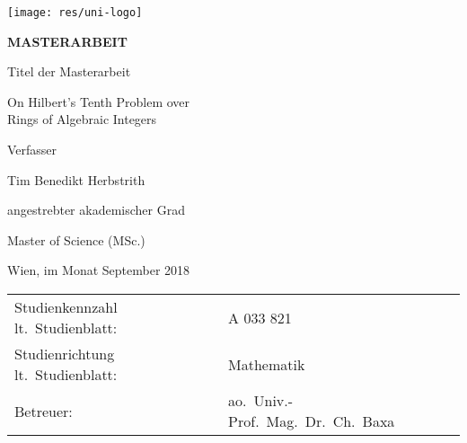 

\begin{titlepage}
\begin{flushright}
    \texttt{[image: res/uni-logo]}
\end{flushright}
\vspace{0.5cm}

\begin{center}  %
    \Huge{\textsf{\textbf{\MakeUppercase{
        Masterarbeit
    }}}}
    \vspace{1.5cm}

    \large{\textsf{  %
        Titel der Masterarbeit
    }}
    \vspace{.1cm}

    \LARGE{\textsf{ On Hilbert's Tenth Problem over\\
                    Rings of Algebraic Integers
    }}
    \vfill

    \large{\textsf{  %
        Verfasser
    }}

    \Large{\textsf{  Tim Benedikt Herbstrith
    }}
    \vfill

    \large{\textsf{
        angestrebter akademischer Grad  %
    }}

    \Large{\textsf{  %
        Master of Science (MSc.)
    }}

\vspace{1.5cm}

\noindent\textsf{Wien, im Monat September 2018}
\vfill

\noindent\begin{tabular}{@{}ll}
\textsf{Studienkennzahl lt.\ Studienblatt:}
&
\textsf{A 033 821}  %
\\
\textsf{Studienrichtung lt.\ Studienblatt:}
&
\textsf{Mathematik}  %
\\
\textsf{Betreuer: }
&
\textsf{ao.~Univ.-Prof.~Mag.~Dr.~Ch.~Baxa}  %
\end{tabular}
\end{center}
\end{titlepage}

